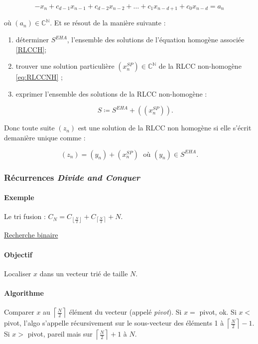 \documentclass{article}
\newcommand{\floor}[1]{{\left\lfloor#1\right\rfloor}}
\newcommand{\ceil}[1]{{\left\lceil#1\right\rceil}}
\begin{document}
			\begin{equation}\label{eq:RLCCNH}
				-x_n + c_{d-1}x_{n-1} + c_{d-2}x_{n-2} + \ldots + c_1x_{n-d+1} + c_0x_{n-d} = a_n
			\end{equation}

			où $(a_n) \in \mathbb C^{\mathbb N}$. Et se résout de la manière suivante :
			\begin{enumerate}
				\item déterminer $S^{EHA}$, l'ensemble des solutions de l'équation homogène associée \eqref{RLCCH};
				\item trouver une solution particulière $(x^{SP}_n) \in \mathbb C^{\mathbb N}$ de la RLCC non-homogène \eqref{eq:RLCCNH} ;
				\item exprimer l'ensemble des solutions de la RLCC non-homogène :
					  
					  \[S \coloneqq S^{EHA} + ((x^{SP}_n)).\]
			\end{enumerate}

			Donc toute suite $(z_n)$ est une solution de la RLCC non homogène si elle s'écrit demanière unique comme :

			\[(z_n) = (y_n) + (x^{SP}_n) \;\text{ où } (y_n) \in S^{EHA}.\]

			\subsubsection{Récurrences \textit{Divide and Conquer}}

			\paragraph{Exemple} Le tri fusion : $C_N = C_\floor{\frac N2} + C_\ceil{\frac N2} + N$.

			\underline{Recherche binaire}

			\paragraph{Objectif} Localiser $x$ dans un vecteur trié de taille $N$.

			\paragraph{Algorithme} Comparer $x$ au $\ceil{\frac N2}$ élément du vecteur (appelé \textit{pivot}). Si $x = $ pivot, ok. Si $x < $ pivot, l'algo s'appelle
			récursivement sur le sous-vecteur des éléments 1 à $\ceil {\frac N2}-1$. Si $x > $ pivot, pareil mais sur $\ceil{\frac N2}+1$ à $N$.
\end{document}
